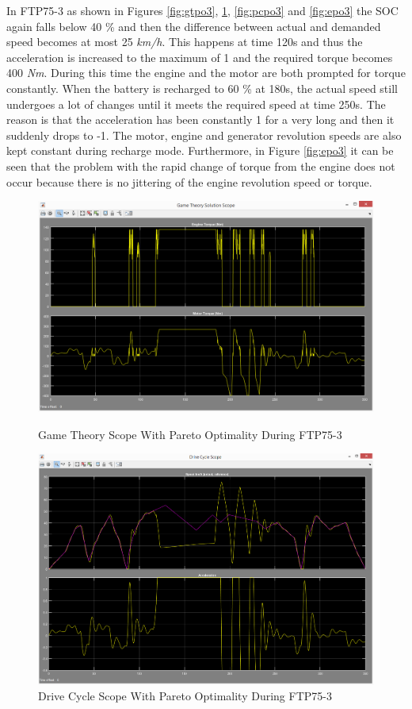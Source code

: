 In FTP75-3 as shown in Figures \ref{fig:gtpo3}, \ref{fig:dcpo3}, \ref{fig:pcpo3} and \ref{fig:epo3} the SOC again falls below 40 \% and then the difference between actual and demanded speed becomes at most 25 \textit{km/h}. This happens at time 120s and thus the acceleration is increased to the maximum of 1 and the required torque becomes 400 \textit{Nm}. During this time the engine and the motor are both prompted for torque constantly. When the battery is recharged to 60 \% at 180s, the actual speed still undergoes a lot of changes until it meets the required speed at time 250s. The reason is that the acceleration has been constantly 1 for a very long and then it suddenly drops to -1. The motor, engine and generator revolution speeds are also kept constant during recharge mode. Furthermore, in Figure \ref{fig:epo3} it can be seen that the problem with the rapid change of torque from the engine does not occur because there is no jittering of the engine revolution speed or torque.

\begin{figure}[hp]
\centering
\includegraphics[scale=0.49]{figures/Pareto/FTP75-3/gameTheory08Juni}
\caption{Game Theory Scope With Pareto Optimality During FTP75-3}
\label{fig:gtpo3}
\includegraphics[scale=0.44]{figures/Pareto/FTP75-3/driveCycle08Juni}
\caption{Drive Cycle Scope With Pareto Optimality During FTP75-3}
\label{fig:dcpo3}
\end{figure}

